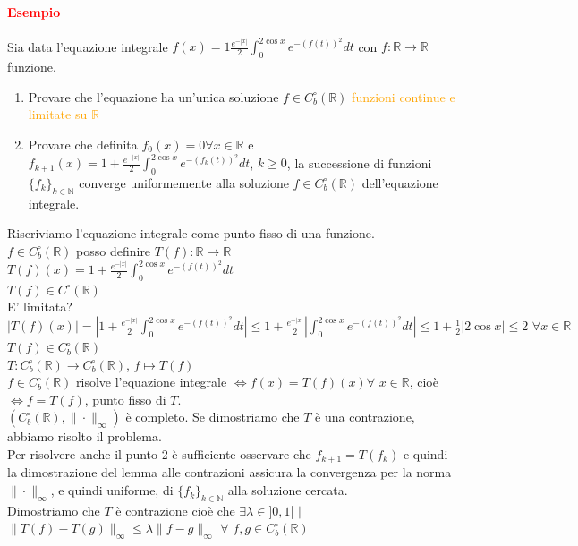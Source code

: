 \documentclass{article}
\newcommand{\R}{\mathbb{R}}
\newcommand{\N}{\mathbb{N}}
\begin{document}
\paragraph{\textcolor{red}{Esempio}}
Sia data l'equazione integrale $f(x)=1\frac{e^{-{|x|}}}{2}\int_{0}^{2\cos x}e^{-(f(t))^2}dt$ con $f:\R \rightarrow \R$ funzione.
\begin{enumerate}
    \item Provare che l'equazione ha un'unica soluzione $f \in C^\circ_b (\R)$ \textcolor{orange}{funzioni continue e limitate su $\R$}
    \item Provare che definita $f_0(x)=0 \forall x \in \R$ e $f_{k+1}(x)=1+\frac{e^{-{|x|}}}{2}\int_{0}^{2\cos x}e^{-(f_k(t))^2}dt$, $k \geq 0$, la successione di funzioni $\{f_{k}\}_{k \in \N}$ converge uniformemente alla soluzione $f \in C^\circ_b(\R)$ dell'equazione integrale.
\end{enumerate}
Riscriviamo l'equazione integrale come punto fisso di una funzione.\\
$f\in C^\circ_b(\R)$ posso definire $ T(f):\R \rightarrow \R$\\
$T(f)(x)= 1+\frac{e^{-{|x|}}}{2}\int_{0}^{2\cos x}e^{-(f(t))^2}dt $\\
$T(f)\in C^\circ(\R)$\\
E' limitata? \\
$|T(f)(x)|=|1+\frac{e^{-{|x|}}}{2}\int_{0}^{2\cos x}e^{-(f(t))^2}dt| \leq 1+ \frac{e^{-{|x|}}}{2}|\int_{0}^{2\cos x}e^{-(f(t))^2}dt|\leq 1+\frac{1}{2}|2\cos x|\leq 2\,\, \forall x \in \R $\\
$T(f)\in C^\circ_b (\R)$\\
$T: C^\circ_b(\R) \rightarrow C^\circ_b(\R)$, $f \mapsto T(f)$\\
$f \in C^\circ_b(\R)$ risolve l'equazione integrale $\Leftrightarrow f(x)= T(f)(x)\forall\,\, x \in \R$, cioè $\Leftrightarrow f=T(f)$, punto fisso di $T$.\\
$(C^\circ_b(\R),\|\cdot \|_\infty)$ è completo. Se dimostriamo che $T$ è una contrazione, abbiamo risolto il problema.\\
Per risolvere anche il punto 2 è sufficiente osservare che $f_{k+1}=T(f_k)$ e quindi la dimostrazione del lemma alle contrazioni assicura la convergenza per la norma $\|\cdot\|_\infty$, e quindi uniforme, di $\{f_k\}_{k \in \N}$ alla soluzione cercata.\\
Dimostriamo che $T$ è contrazione cioè che $\exists \lambda \in ]0,1[$ $|$ $\| T(f)-T(g) \|_\infty \leq \lambda \|f-g\|_\infty \,\, \forall \,\, f,g\in C^\circ_b (\R)$\\
\end{document}
